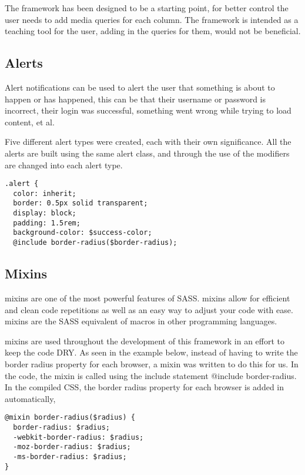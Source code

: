 The framework has been designed to be a starting point, for better control the user needs to add media queries for each column. The framework is intended as a teaching tool for the user, adding in the queries for them, would not be beneficial. 

\newpage
\subsection*{Alerts}
Alert notifications can be used to alert the user that something is about to happen or has happened, this can be that their username or password is incorrect, their login was successful, something went wrong while trying to load content, et al.

Five different alert types were created, each with their own significance. All the alerts are built using the same alert class, and through the use of the modifiers are changed into each alert type. 

\begin{lstlisting}[language=CSS3]
.alert {
  color: inherit;
  border: 0.5px solid transparent;
  display: block;
  padding: 1.5rem;
  background-color: $success-color;
  @include border-radius($border-radius);
\end{lstlisting}

\subsection*{Mixins}
\gls{mixins} are one of the most powerful features of \gls{SASS}. \gls{mixins} allow for efficient and clean code repetitions as well as an easy way to adjust your code with ease. \gls{mixins} are the \gls{SASS} equivalent of macros in other programming languages.

\gls{mixins} are used throughout the development of this framework in an effort to keep the code DRY. As seen in the example below, instead of having to write the border radius property for each browser, a mixin was written to do this for us. In the code, the mixin is called using the include statement @include border-radius. In the compiled CSS, the border radius property for each browser is added in automatically, 

\begin{lstlisting}[language=CSS3]
@mixin border-radius($radius) {
  border-radius: $radius;
  -webkit-border-radius: $radius;
  -moz-border-radius: $radius;
  -ms-border-radius: $radius;
}
\end{lstlisting}


